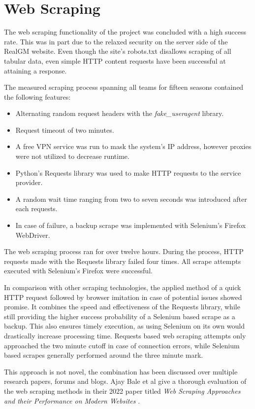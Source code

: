\documentclass{thesis-ekf}
\theoremstyle{definition}
\theoremstyle{remark}
\begin{document}
\section{Web Scraping}
The web scraping functionality of the project was concluded with a high success rate. This was in part due to the relaxed security on the server side of the RealGM website. Even though the site's robots.txt disallows scraping of all tabular data, even simple HTTP content requests have been successful at attaining a response.

The measured scraping process spanning all teams for fifteen seasons contained the following features:
\begin{itemize}
	\item Alternating random request headers with the \emph{fake\_useragent} library.
	\item Request timeout of two minutes.
	\item A free VPN service was run to mask the system's IP address, however proxies were not utilized to decrease runtime.
	\item Python's Requests library was used to make HTTP requests to the service provider.
	\item A random wait time ranging from two to seven seconds was introduced after each requests.
	\item In case of failure, a backup scrape was implemented with Selenium's Firefox WebDriver.
\end{itemize}
The web scraping process ran for over twelve hours. During the process, HTTP requests made with the Requests library failed four times. All scrape attempts executed with Selenium's Firefox were successful.

In comparison with other scraping technologies, the applied method of a quick HTTP request followed by browser imitation in case of potential issues showed promise. It combines the speed and effectiveness of the Requests library, while still providing the higher success probability of a Selenium based scrape as a backup. This also ensures timely execution, as using Selenium on its own would drastically increase processing time. Requests based web scraping attempts only approached the two minute cutoff in case of connection errors, while Selenium based scrapes generally performed around the three minute mark.

This approach is not novel, the combination has been discussed over multiple research papers, forums and blogs. Ajay Bale et al give a thorough evaluation of the web scraping methods in their 2022 paper titled \emph{Web Scraping Approaches and their Performance on Modern Websites} \cite{bale}.
\end{document}
